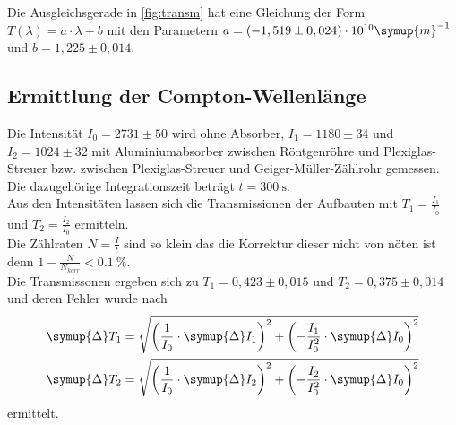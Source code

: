 \noindent Die Ausgleichsgerade in \autoref{fig:transm} hat eine Gleichung der Form $T(\lambda) = a \cdot \lambda + b$ mit 
den Parametern $a = (-1,519 \pm 0,024)\cdot 10^{10}\symup{m}^{-1}$ und $b = 1,225 \pm 0,014$.




\subsection{Ermittlung der Compton-Wellenlänge}
\label{subsec:comptonwellenl}

Die Intensität $I_0 = 2731 \pm 50$ wird ohne Absorber, $I_1 = 1180 \pm 34$ und $I_2 = 1024 \pm 32$ mit Aluminiumabsorber zwischen Röntgenröhre
und Plexiglas-Streuer bzw. zwischen Plexiglas-Streuer und Geiger-Müller-Zählrohr gemessen.\\
Die dazugehörige Integrationszeit beträgt $t = \SI{300}{\second}$.\\

\noindent Aus den Intensitäten lassen sich die Transmissionen der Aufbauten mit $T_1 = \frac{I_1}{I_0}$ und $T_2 = \frac{I_2}{I_0}$ ermitteln. \\
Die Zählraten $N = \frac{I}{t}$ sind so klein das die Korrektur dieser nicht von nöten ist denn $1-\frac{N}{N_{korr}} < \SI{0,1}{\percent}$.\\
Die Transmissonen ergeben sich zu $T_1 = 0,423 \pm 0,015$ und $T_2 = 0,375 \pm 0,014$ und deren Fehler wurde nach
\begin{align*}
  \symup{\Delta}T_1 &= \sqrt{\left(\frac{1}{I_0}\cdot \symup{\Delta}I_1\right)^2 + \left(-\frac{I_1}{I_0^2}\cdot \symup{\Delta}I_0\right)^2} \\
  \symup{\Delta}T_2 &= \sqrt{\left(\frac{1}{I_0}\cdot \symup{\Delta}I_2\right)^2 + \left(-\frac{I_2}{I_0^2}\cdot \symup{\Delta}I_0\right)^2}
\end{align*}
ermittelt.\\

